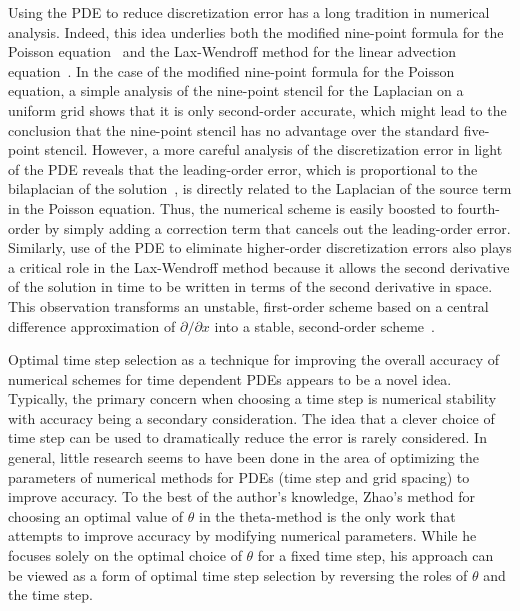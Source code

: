\documentclass[oneeqnum,onefignum,onetabnum,onethmnum]{siamltex}
\begin{document}
Using the PDE to reduce discretization error has a long 
tradition in numerical analysis.  Indeed, this idea underlies both the 
modified nine-point formula for the Poisson equation~\cite{iserles_book} and 
the Lax-Wendroff method for the linear advection 
equation~\cite{leveque_book_1992, leveque_book_2002, gko_book}.  
In the case of the modified nine-point formula for the Poisson equation, a 
simple analysis of the nine-point stencil for the Laplacian on a uniform grid 
shows that it is only second-order accurate, which might lead to the conclusion 
that the nine-point stencil has no advantage over the standard five-point 
stencil.  However, a more careful analysis of the discretization error in 
light of the PDE reveals that the leading-order error, which is proportional 
to the bilaplacian of the solution~\cite{iserles_book, patra_2005}, is directly 
related to the Laplacian of the source term in the Poisson equation.  Thus, 
the numerical scheme is easily boosted to fourth-order by simply adding a 
correction term that cancels out the leading-order error.   
Similarly, use of the PDE to eliminate higher-order discretization errors also 
plays a critical role in the Lax-Wendroff method because it allows the second 
derivative of the solution in time to be written in terms of the second 
derivative in space.  This observation transforms an unstable, first-order 
scheme based on a central difference approximation of 
$\partial/\partial x$ into a stable, second-order 
scheme~\cite{leveque_book_1992, leveque_book_2002}.

Optimal time step selection as a technique for improving the overall accuracy 
of numerical schemes for time dependent PDEs appears to be a novel idea.
Typically, the primary concern when choosing a time step is numerical 
stability with accuracy being a secondary consideration.  The idea that a 
clever choice of time step can be used to dramatically reduce the error is 
rarely considered.  In general, little research seems to have been done in
the area of optimizing the parameters of numerical methods for PDEs (\eg time 
step and grid spacing) to improve accuracy.  To the best of the author's 
knowledge, Zhao's method for choosing an optimal value of $\theta$ in the 
theta-method is the only work that attempts to improve accuracy by modifying 
numerical parameters.  While he focuses solely on the optimal choice of 
$\theta$ for a fixed time step, his approach can be viewed as a form of 
optimal time step selection by reversing the roles of $\theta$ and the time 
step.  
\end{document}
